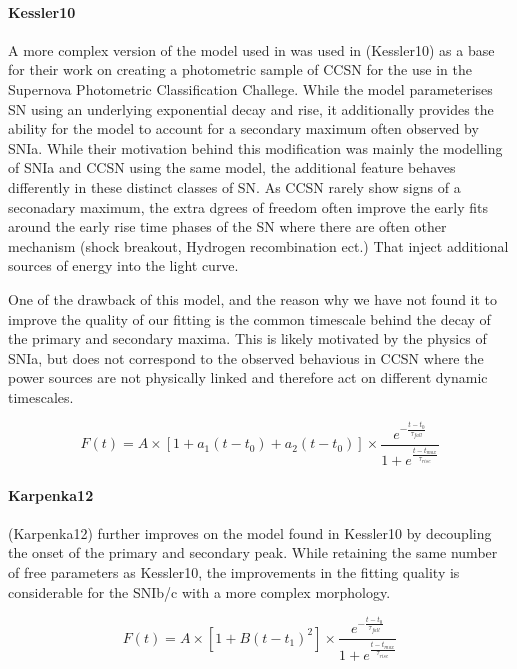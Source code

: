 \paragraph{Kessler10}
A more complex version of the model used in \citet{Bazin2009} was used in \citet{Kessler2010} (Kessler10) as a base for their work on creating a photometric sample of CCSN for the use in the Supernova Photometric Classification Challege. While the model parameterises SN using an underlying exponential decay and rise, it additionally provides the ability for the model to account for a secondary maximum often observed by SNIa. While their motivation behind this modification was mainly the modelling of SNIa and CCSN using the same model, the additional feature behaves differently in these distinct classes of SN. As CCSN rarely show signs of a seconadary maximum, the extra dgrees of freedom often improve the early fits around the early rise time phases of the SN where there are often other mechanism (shock breakout, Hydrogen recombination ect.) That inject additional sources of energy into the light curve.

One of the drawback of this model, and the reason why we have not found it to improve the quality of our fitting is the common timescale behind the decay of the primary and secondary maxima. This is likely motivated by the physics of SNIa, but does not correspond to the observed behavious in CCSN where the power sources are not physically linked and therefore act on different dynamic timescales.

\begin{equation}
  F(t) = A \times [1 + a_1(t - {t_0}) + a_2(t - {t_0})] \times \frac{e^{-\frac{t - t_{0}}{\tau_{fall}}}} {1 + e^{\frac{t - t_{max}}{\tau_{rise}}}}
\end{equation}

\paragraph{Karpenka12}
\citet{Karpenka2012} (Karpenka12) further improves on the model found in Kessler10 by decoupling the onset of the primary and secondary peak. While retaining the same number of free parameters as Kessler10, the improvements in the fitting quality is considerable for the SNIb/c with a more complex morphology.

\begin{equation}
  F(t) = A \times [1 + B(t - {t_1})^2] \times \frac{e^{-\frac{t - t_{0}}{\tau_{fall}}}} {1 + e^{\frac{t - t_{max}}{\tau_{rise}}}}
\end{equation}

